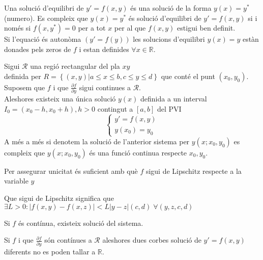 \documentclass[../main.tex]{subfiles}
\begin{document}
Una solució d'equilibri de $y' = f(x, y)$ és una solució de la forma $y(x) = y^*$ (numero). Es
compleix que $y(x) = y^*$ és solució d'equilibri de $y' = f(x, y)$ si i només si $f(x, y^*) = 0$ per
a tot $x$ per al que $f(x, y)$ estigui ben definit.\\
Si l'equació és autonòma $\left(y' = f(y)\right)$ les solucions d'equilibri $y(x) = y$ estàn donades pels zeros
de $f$ i estan definides $\forall x \in \mathbb{R}$.
\begin{teorema}
    Sigui $\mathcal{R}$ una regió rectangular del pla $xy$\\definida per $R = \left\{(x, y) | a \leq x \leq b, c \leq y \leq d\right\}$
    que conté el punt $(x_0, y_0)$.\\
    Suposem que $f$ i que $\frac{\partial f}{\partial y}$ sigui continues a $\mathcal{R}$.\\
    Aleshores existeix una única solució $y(x)$ definida a un interval $I_0 = (x_0-h, x_0+h), h > 0$ contingut a $\left[a, b\right]$ del PVI
    \begin{displaymath}
        \begin{cases}
            y' = f(x,y)\\
            y(x_0) = y_0
        \end{cases}
    \end{displaymath}
    A més a més si denotem la solució de l'anterior sistema per $y(x; x_0, y_0)$ es compleix que $y(x; x_0, y_0)$
    és una funció continua respecte $x_0, y_0$.
    \begin{obs}
        Per assegurar unicitat és suficient amb què $f$ sigui de Lipschitz respecte a la variable $y$
        \begin{obs}
            Que sigui de Lipschitz significa que $\exists L > 0: \left\lvert f(x,y) - f(x,z)\right\rvert < L \left\lvert y-z\right\rvert(c, d)\;\forall(y, z, c, d)$
        \end{obs}
    \end{obs}
\end{teorema}
\begin{teorema}[de Peano]
    Si $f$ és contínua, existeix solució del sistema.
\end{teorema}
\begin{teorema}
    Si $f$ i que $\frac{\partial f}{\partial y}$ són contínues a $\mathcal{R}$ aleshores dues corbes
    solució de $y' = f(x,y)$ diferents no es poden tallar a $\mathbb{R}$.
\end{teorema}
\end{document}

